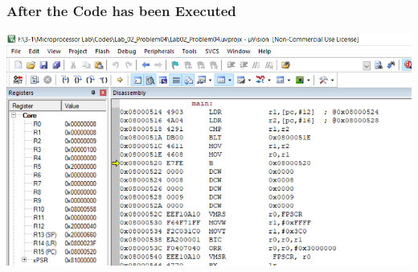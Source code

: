 \documentclass{article}
\begin{document}
\subsubsection{After the Code has been Executed}
\begin{center}
    \includegraphics[width=1.1\textwidth]{problem04_02.png}
\end{center}
\end{document}
